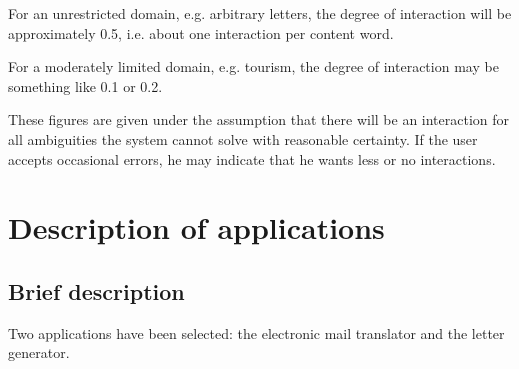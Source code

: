 For an unrestricted domain, e.g. arbitrary letters, the degree of interaction 
will be approximately 0.5, i.e. about one interaction per content word.

For a moderately limited domain, e.g. tourism, the degree of interaction 
may be something like 0.1 or 0.2. 

These figures are given under the assumption that there will be an interaction
for all ambiguities the system cannot solve with reasonable
certainty. If the user accepts occasional errors, 
he may indicate that he wants less or no 
interactions. 


\section{Description of applications}

\subsection{Brief description}

Two applications have been selected: the
electronic mail translator and the letter generator. 

